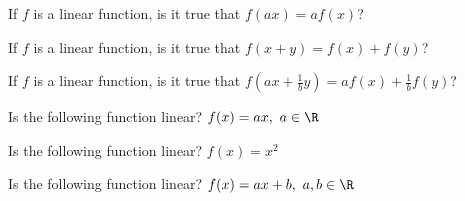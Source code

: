 

\begin{enumerate}

\qitem  If $f$ is a linear function, is it true that $f(ax) = af(x)$?





\qitem  If $f$ is a linear function, is it true that $f(x + y) = f(x) + f(y)$?




\qitem If $f$ is a linear function, is it true that $f(ax + \frac{1}{b}y) = af(x) + \frac{1}{b}f(y)$?


\qitem Is the following function linear? $f(x) = ax,\ a \in \R$


\qitem Is the following function linear? $f(x) = x^2$


\qitem  Is the following function linear? $f(x) = ax+b,\ a,b \in \R$










\end{enumerate}